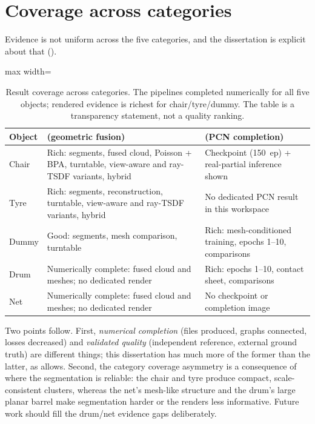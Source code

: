 \section{Coverage across categories}
\label{sec:disc_coverage}

Evidence is not uniform across the five categories, and the dissertation is
explicit about that ().

\begin{table}[H]
  \centering
  \small
  \begin{adjustbox}{max width=\textwidth}
  \begin{tabular}{@{}p{1.6cm}p{6.3cm}p{6.3cm}@{}}
    \toprule
    Object & \routeA{} (geometric fusion) & \routeB{} (PCN completion) \\
    \midrule
    Chair & Rich: segments, fused cloud, Poisson + BPA, turntable, view-aware
    and ray-TSDF variants, hybrid & Checkpoint (150~ep) + real-partial
    inference shown \\
    Tyre & Rich: segments, reconstruction, turntable, view-aware and ray-TSDF
    variants, hybrid & No dedicated PCN result in this workspace \\
    Dummy & Good: segments, mesh comparison, turntable & Rich: mesh-conditioned
    training, epochs 1--10, comparisons \\
    Drum & Numerically complete: fused cloud and meshes; no dedicated render &
    Rich: epochs 1--10, contact sheet, comparisons \\
    Net & Numerically complete: fused cloud and meshes; no dedicated render &
    No checkpoint or completion image \\
    \bottomrule
  \end{tabular}
  \end{adjustbox}
  \caption{Result coverage across categories. The pipelines completed
  numerically for all five objects; rendered evidence is richest for
  chair/tyre/dummy. The table is a transparency statement, not a quality
  ranking.}
  \label{tab:coverage}
\end{table}

Two points follow. First, \emph{numerical completion} (files produced, graphs
connected, losses decreased) and \emph{validated quality} (independent
reference, external ground truth) are different things; this dissertation has
much more of the former than the latter, as \suop{} allows. Second, the
category coverage asymmetry is a consequence of where the segmentation is
reliable: the chair and tyre produce compact, scale-consistent clusters,
whereas the net's mesh-like structure and the drum's large planar barrel make
segmentation harder or the renders less informative. Future work should fill
the drum/net evidence gaps deliberately.

